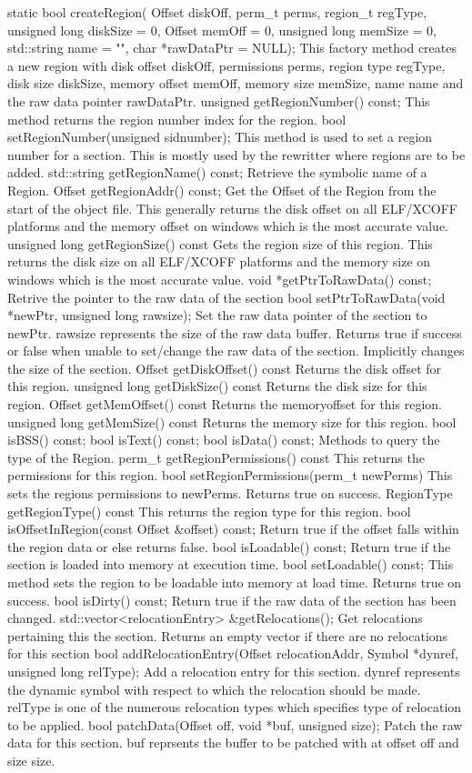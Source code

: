 static bool createRegion( Offset diskOff, perm_t perms, region_t regType,
unsigned long diskSize = 0, Offset memOff = 0, 
unsigned long memSize = 0, std::string name = "",
char *rawDataPtr = NULL);
This factory method creates a new region with disk offset diskOff, permissions perms, region type regType, disk size diskSize, memory offset memOff, memory size memSize, name name and the raw data pointer rawDataPtr.
unsigned getRegionNumber() const;
This method returns the region number index for the region.
bool setRegionNumber(unsigned sidnumber);
This method is used to set a region number for a section. This is mostly used by the rewritter where regions are to be added.
std::string getRegionName() const;
Retrieve the symbolic name of a Region.
Offset getRegionAddr() const;
Get the Offset of the Region from the start of the object file. This generally returns the disk offset on all ELF/XCOFF platforms and the memory offset on windows which is the most accurate value.
unsigned long getRegionSize() const
Gets the region size of this region. This returns the disk size on all ELF/XCOFF platforms and the memory size on windows which is the most accurate value.
void *getPtrToRawData() const;
Retrive the pointer to the raw data of the section
bool setPtrToRawData(void *newPtr, unsigned long rawsize);
Set the raw data pointer of the section to newPtr. rawsize represents the size of the raw data buffer. 
Returns true if success or false when unable to set/change the raw data of the section. Implicitly changes the size of the section.
Offset getDiskOffset() const
Returns the disk offset for this region. 
unsigned long getDiskSize() const
Returns the disk size for this region.
Offset getMemOffset() const
Returns the memoryoffset for this region.
unsigned long getMemSize() const
Returns the memory size for this region.
bool isBSS() const;
bool isText() const;
bool isData() const;
Methods to query the type of the Region.
perm_t getRegionPermissions() const
This returns the permissions for this region.
bool setRegionPermissions(perm_t newPerms)
This sets the regions permissions to newPerms. Returns true on success.
RegionType getRegionType() const
This returns the region type for this region.
bool isOffsetInRegion(const Offset &offset) const;
Return true if the offset falls within the region data or else returns false.
bool isLoadable() const;
Return true if the section is loaded into memory at execution time.
bool setLoadable() const;
This method sets the region to be loadable into memory at load time. Returns true on success.
bool isDirty() const;
Return true if the raw data of the section has been changed.
std::vector<relocationEntry> &getRelocations();
Get relocations pertaining this the section. Returns an empty vector if there are no relocations for this section
bool addRelocationEntry(Offset relocationAddr, Symbol *dynref, 
unsigned long relType);
Add a relocation entry for this section. dynref represents the dynamic symbol with respect to which the relocation should be made. relType is one of the numerous relocation types which specifies type of relocation to be applied.
bool patchData(Offset off, void *buf, unsigned size);
Patch the raw data for this section. buf reprsents the buffer to be patched with at offset off and size size.

